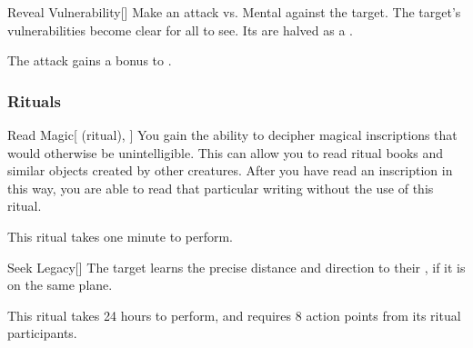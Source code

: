 \lowercase{\hypertarget{spell:Reveal Vulnerability}{}}\label{spell:Reveal Vulnerability}
\begin{freeability}[Rank 6]{\hypertarget{spell:Reveal Vulnerability}{Reveal Vulnerability}}[]
Make an attack vs. Mental against the target.
\hit The target's vulnerabilities become clear for all to see.
Its  are halved as a .

\rankline
{} The attack gains a  bonus to .
\end{freeability}
\vspace{0.25em}



\subsubsection{Rituals}


\lowercase{\hypertarget{spell:Read Magic}{}}\label{spell:Read Magic}
\begin{attuneability}[Rank 1]{\hypertarget{spell:Read Magic}{Read Magic}}[ (ritual), ]
You gain the ability to decipher magical inscriptions that would otherwise be unintelligible.
This can allow you to read ritual books and similar objects created by other creatures.
After you have read an inscription in this way, you are able to read that particular writing without the use of this ritual.

This ritual takes one minute to perform.
\end{attuneability}
\vspace{0.25em}



\lowercase{\hypertarget{spell:Seek Legacy}{}}\label{spell:Seek Legacy}
\begin{apability}[Rank 3]{\hypertarget{spell:Seek Legacy}{Seek Legacy}}[]
The target learns the precise distance and direction to their , if it is on the same plane.

This ritual takes 24 hours to perform, and requires 8 action points from its ritual participants.
\end{apability}
\vspace{0.25em}



